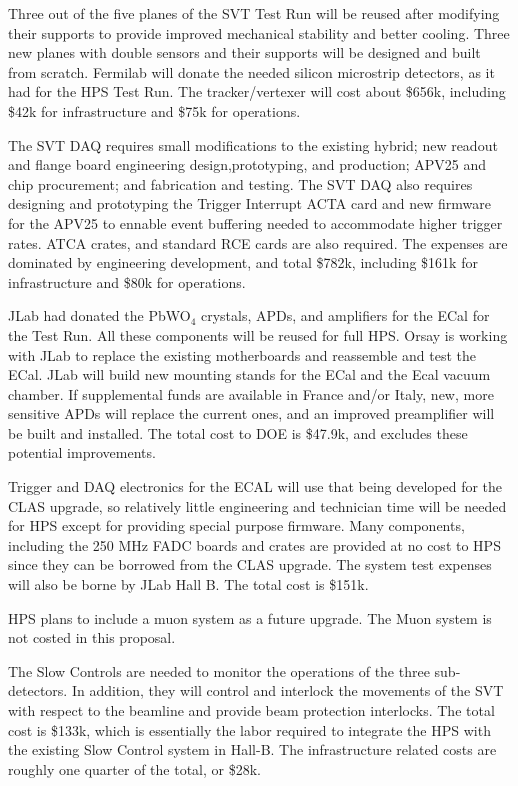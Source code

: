 Three out of the five planes of the SVT Test Run will be reused after modifying their supports to provide improved 
mechanical stability and better cooling. Three new planes with double sensors and their supports will be designed and built from 
scratch. Fermilab will donate the needed silicon microstrip detectors, as it had for the HPS Test Run. The tracker/vertexer  will cost about \$656k, including \$42k for 
infrastructure and \$75k for operations.

The SVT DAQ requires small modifications to the  existing hybrid; new readout and flange board engineering design,prototyping, and 
production; 
APV25 and chip procurement; and  fabrication and testing. The SVT DAQ also requires designing and prototyping the Trigger Interrupt 
ACTA card and new firmware for the APV25 to ennable event buffering needed to accommodate higher trigger rates. ATCA crates, and standard 
RCE cards are also required. The expenses are dominated by engineering development, and total \$782k, including \$161k for infrastructure and \$80k for operations.  

JLab had donated the PbWO$_4$ crystals, APDs, and amplifiers for the ECal for the Test Run. All these components will be reused for full HPS. 
Orsay is working with JLab to replace the existing motherboards and reassemble and test the ECal. JLab will build new mounting stands for 
the ECal and the Ecal vacuum chamber. If supplemental funds are available in France and/or Italy, new, more sensitive APDs will replace 
the current ones, and an improved preamplifier will be built and installed. The total cost to DOE is \$47.9k, and excludes these potential improvements. 

Trigger and DAQ electronics for the ECAL will use that being developed for 
the CLAS upgrade, so relatively little engineering and technician time will be needed for HPS except 
for providing special purpose firmware. Many components, including the 250 MHz FADC boards and crates are provided at no cost to HPS  
since they can be borrowed from the CLAS upgrade. The system test expenses will also be borne by JLab Hall B. The total cost 
is \$151k. 

HPS plans to include a muon system as a future upgrade. The Muon system is not costed in this proposal.

The Slow Controls are needed to monitor the operations of the three sub-detectors. In addition, they will control and interlock the 
movements of the SVT with respect to the beamline and provide beam protection interlocks. The total cost is \$133k, which is essentially 
the labor required to integrate the HPS with the existing Slow Control system in Hall-B. The infrastructure related costs are roughly
one quarter of the total, or \$28k.


